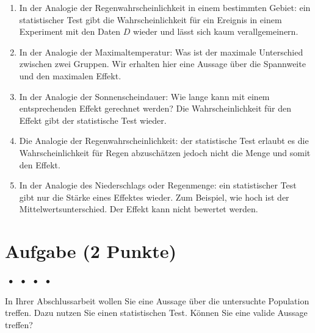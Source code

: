 \documentclass[a4paper, 9pt]{scrartcl}\usepackage[]{graphicx}\usepackage[]{xcolor}
\begin{document}
\begin{enumerate}
\item [\textbf{A} \msquare] In der Analogie der Regenwahrscheinlichkeit in einem bestimmten Gebiet: ein statistischer Test gibt die Wahrscheinlichkeit für ein Ereignis in einem Experiment mit den Daten $D$ wieder und lässt sich kaum verallgemeinern.
\item [\textbf{B} \msquare] In der Analogie der Maximaltemperatur: Was ist der maximale Unterschied zwischen zwei Gruppen. Wir erhalten hier eine Aussage über die Spannweite und den maximalen Effekt.
\item [\textbf{C} \msquare] In der Analogie der Sonnenscheindauer: Wie lange kann mit einem entsprechenden Effekt gerechnet werden? Die Wahrscheinlichkeit für den Effekt gibt der statistische Test wieder.
\item [\textbf{D} \msquare] Die Analogie der Regenwahrscheinlichkeit: der statistische Test erlaubt es die Wahrscheinlichkeit für Regen abzuschätzen jedoch nicht die Menge und somit den Effekt.
\item [\textbf{E} \msquare] In der Analogie des Niederschlags oder Regenmenge: ein statistischer Test gibt nur die Stärke eines Effektes wieder. Zum Beispiel, wie hoch ist der Mittelwertsunterschied. Der Effekt kann nicht bewertet werden.
\end{enumerate}

\section{Aufgabe \hfill (2 Punkte)}

\ifcollection
\begin{flushright}
\tiny\vspace{-2Ex}
\textbf{\examinhaltstart}
\exammodulemathstat $\;\bullet$
\exammodulestat $\;\bullet$
\exammodulestatbbv $\;\bullet$
\exammodulestatversuch $\;\bullet$
\exammodulebiostat
\vspace{-1Ex}
\end{flushright}
\fi




In Ihrer Abschlussarbeit wollen Sie eine Aussage über die untersuchte Population treffen. Dazu nutzen Sie einen statistischen Test. Können Sie eine valide Aussage treffen?
\end{document}
